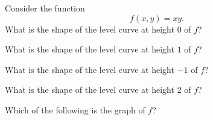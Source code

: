 \documentclass{ximera}
\begin{document}
\begin{problem}
Consider the function
\[
f(x,y) = xy.
\]
What is the shape of the level curve at height $0$ of $f$?
\begin{multipleChoice}
\end{multipleChoice}

What is the shape of the level curve at height $1$ of $f$?
\begin{multipleChoice}
\end{multipleChoice}

What is the shape of the level curve at height $-1$ of $f$?
\begin{multipleChoice}
\end{multipleChoice}

What is the shape of the level curve at height $2$ of $f$?
\begin{multipleChoice}
\end{multipleChoice}

Which of the following is the graph of $f$?


\end{problem}
\end{document}
